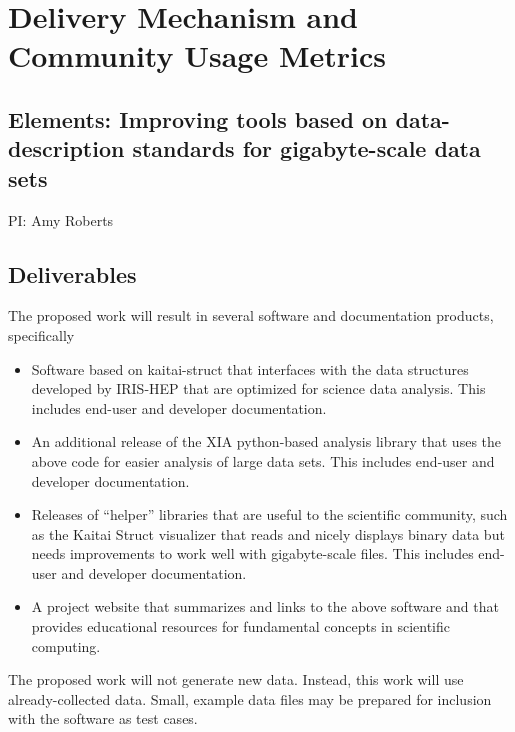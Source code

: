 \documentclass[11pt,oneside]{memoir}
\begin{document}
\mainmatter
\pagestyle{bodystyle}

\section*{Delivery Mechanism and Community Usage Metrics}
\subsection*{Elements: Improving tools based on data-description standards for gigabyte-scale data sets}
\hspace{1cm}
\newline
PI: Amy Roberts

\subsection{Deliverables}

The proposed work will result in several software and documentation products, specifically

\begin{itemize}
    \item Software based on kaitai-struct that interfaces with the data structures developed by IRIS-HEP that are optimized for science data analysis.  This includes end-user and developer documentation.
    \item An additional release of the XIA python-based analysis library that uses the above code for easier analysis of large data sets.  This includes end-user and developer documentation.
    \item Releases of ``helper'' libraries that are useful to the scientific community, such as the Kaitai Struct visualizer that reads and nicely displays binary data but needs improvements to work well with gigabyte-scale files.  This includes end-user and developer documentation.
    \item A project website that summarizes and links to the above software and that provides educational resources for fundamental concepts in scientific computing.
\end{itemize}

The proposed work will not generate new data.  Instead, this work will use already-collected data.  Small, example data files may be prepared for inclusion with the software as test cases.
\end{document}
